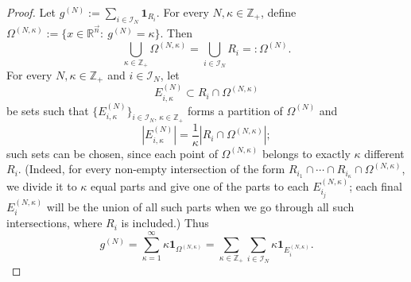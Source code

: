 \documentclass[11pt, reqno]{amsart}
\theoremstyle{definition}
\theoremstyle{remark}
\numberwithin{equation}{section}
\newcommand{\Z}{\mathbb Z}
\newcommand{\one}{\mathbf{1}}
\newcommand{\abs}[1]{|#1|}
\begin{document}
\begin{proof}
Let $g^{(N)}:=\sum_{i\in \mathscr I_N} \mathbf 1_{R_i}$.
For every $N,\kappa\in\mathbb Z_+$, define
$
\Omega^{(N,\kappa)}:=\{x\in\mathbb R^{\vec n}:\ g^{(N)}=\kappa\}.
$
Then $$\bigcup_{\kappa\in\mathbb Z_+} \Omega^{(N,\kappa)}
= \bigcup_{i\in \mathscr I_N} R_i =:\Omega^{(N)}.$$
For every $N,\kappa\in\mathbb Z_+$ and $i\in \mathscr I_N$, let
\begin{equation*}
  E^{(N)}_{i,\kappa}\subset R_i\cap\Omega^{(N,\kappa)}
\end{equation*}
be sets such that $\{E_{i,\kappa}^{(N)}\}_{i\in \mathscr I_N,\,\kappa\in\mathbb Z_+}$ forms a partition of $\Omega^{(N)}$ and
\begin{equation*}
  \abs{E^{(N)}_{i,\kappa}}=\frac{1}{\kappa}\abs{R_i\cap\Omega^{(N,\kappa)}};
\end{equation*}
such sets can be chosen, since each point of $\Omega^{(N,\kappa)}$ belongs to exactly $\kappa$ different $R_i$. (Indeed, for every non-empty intersection of the form $R_{i_1}\cap\cdots\cap R_{i_\kappa}\cap\Omega^{(N,\kappa)}$, we divide it to $\kappa$ equal parts and give one of the parts to each $E_{i_j}^{(N,\kappa)}$; each final $E_i^{(N,\kappa)}$ will be the union of all such parts when we go through all such intersections, where $R_i$ is included.)
Thus
\begin{equation}\label{eq:gN-ENk}
  g^{(N)}=\sum_{\kappa=1}^\infty\kappa\one_{\Omega^{(N,\kappa)}}
  =\sum_{\kappa\in\Z_+}\sum_{i\in\mathscr I_N}\kappa\one_{E^{(N,\kappa)}_i}.
\end{equation}


\end{proof}
\end{document}
